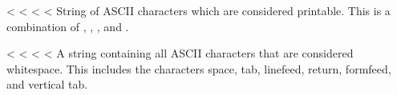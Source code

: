 \documentclass[letterpaper,10pt,english]{sphinxmanual}
\begin{document}

\vspace{5px}

\begin{fulllineitems}
\label{\detokenize{string:string.printable}}<%
\pysigstartsignatures
<%
<%
<%
String of ASCII characters which are considered printable.  This is a
combination of {\hyperref[\detokenize{string:string.digits}]{}}, {\hyperref[\detokenize{string:string.ascii_letters}]{}}, {\hyperref[\detokenize{string:string.punctuation}]{}},
and {\hyperref[\detokenize{string:string.whitespace}]{}}.

\end{fulllineitems}


\vspace{5px}

\begin{fulllineitems}
\label{\detokenize{string:string.whitespace}}<%
\pysigstartsignatures
<%
<%
<%
A string containing all ASCII characters that are considered whitespace.
This includes the characters space, tab, linefeed, return, formfeed, and
vertical tab.

\end{fulllineitems}
\end{document}
